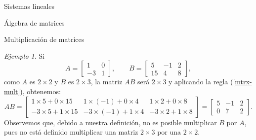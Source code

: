\documentclass[a4paper,12pt,twoside,spanish,reqno]{amsbook}
\numberwithin{equation}{section}
\theoremstyle{definition}
\theoremstyle{remark}
\newtheorem*{ejemplo*}{Ejemplo}
\begin{document}
\begin{chapter}{Sistemas lineales}
\begin{section}{Álgebra de matrices}
\begin{subsection}{Multiplicación de matrices}
                \begin{ejemplo*}
                    Si 
                    \begin{equation*}
                        A = \begin{bmatrix}1&0\\-3&1\end{bmatrix}, \qquad B = \begin{bmatrix}5&-1&2\\15&4&8\end{bmatrix},
                    \end{equation*}
                    como $A$ es $2 \times 2$ y $B$ es $2 \times 3$, la matriz $AB$ será $2 \times 3$ y  aplicando la regla (\ref{mtrx-mult}), obtenemos:
                    \begin{equation*}
                        AB = \begin{bmatrix}1\times  5 + 0\times 15&1\times (-1) + 0\times 4&1\times 2 + 0\times 8
                            \\-3\times 5 + 1\times 15&-3\times (-1) + 1\times 4&-3\times 2 + 1\times 8
                        \end{bmatrix} =
                        \begin{bmatrix} 5 &-1 &2 
                            \\ 0 &7 &2
                        \end{bmatrix}.
                    \end{equation*}
                    Observemos que, debido a nuestra definición, no es posible multiplicar $B$ por $A$, pues no está definido multiplicar una matriz $2 \times 3$ por una $2 \times 2$.
                \end{ejemplo*}
                     

\end{subsection}
\end{section}
\end{chapter}
\end{document}
